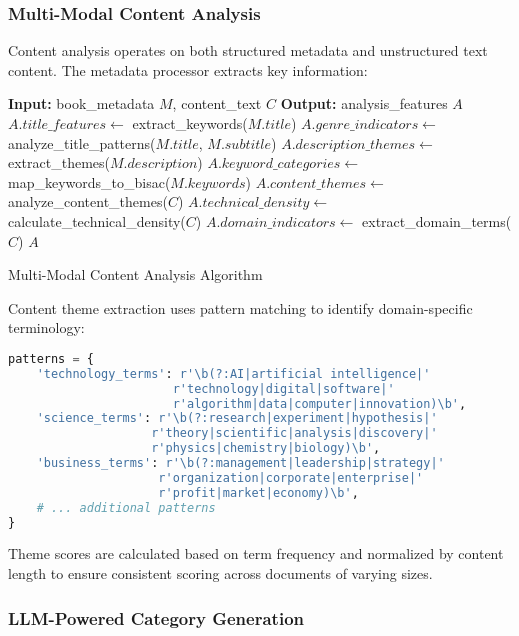 \documentclass{article}
\begin{document}
\subsubsection{Multi-Modal Content Analysis}

Content analysis operates on both structured metadata and unstructured text content. The metadata processor extracts key information:

\begin{algorithm}
\begin{algorithmic}[1]
\STATE \textbf{Input:} book\_metadata $M$, content\_text $C$
\STATE \textbf{Output:} analysis\_features $A$
\STATE
\STATE $A.title\_features \leftarrow$ extract\_keywords($M.title$)
\STATE $A.genre\_indicators \leftarrow$ analyze\_title\_patterns($M.title$, $M.subtitle$)
\STATE $A.description\_themes \leftarrow$ extract\_themes($M.description$)
\STATE $A.keyword\_categories \leftarrow$ map\_keywords\_to\_bisac($M.keywords$)
\STATE
{}
    \STATE $A.content\_themes \leftarrow$ analyze\_content\_themes($C$)
    \STATE $A.technical\_density \leftarrow$ calculate\_technical\_density($C$)
    \STATE $A.domain\_indicators \leftarrow$ extract\_domain\_terms($C$)
\ENDIF
\STATE
\RETURN $A$
\end{algorithmic}
\caption{Multi-Modal Content Analysis Algorithm}
\label{alg:content_analysis}
\end{algorithm}

Content theme extraction uses pattern matching to identify domain-specific terminology:

\begin{lstlisting}[language=python, caption=Theme Extraction Patterns]
patterns = {
    'technology_terms': r'\b(?:AI|artificial intelligence|'
                       r'technology|digital|software|'
                       r'algorithm|data|computer|innovation)\b',
    'science_terms': r'\b(?:research|experiment|hypothesis|'
                    r'theory|scientific|analysis|discovery|'
                    r'physics|chemistry|biology)\b',
    'business_terms': r'\b(?:management|leadership|strategy|'
                     r'organization|corporate|enterprise|'
                     r'profit|market|economy)\b',
    # ... additional patterns
}
\end{lstlisting}

Theme scores are calculated based on term frequency and normalized by content length to ensure consistent scoring across documents of varying sizes.

\subsubsection{LLM-Powered Category Generation}
\end{document}
